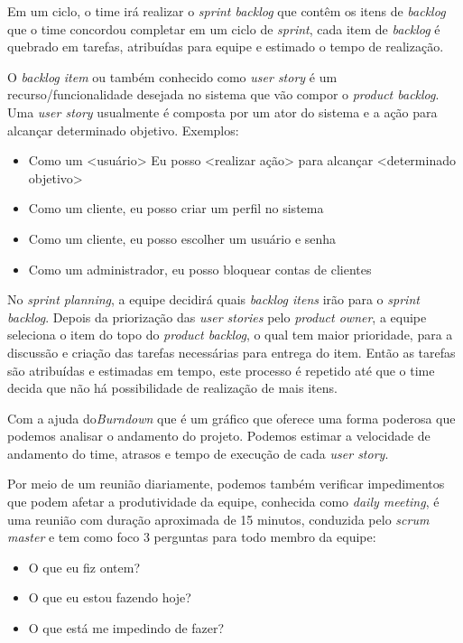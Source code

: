 \documentclass{abnt}
\begin{document}
			Em um ciclo, o time irá realizar o \emph{sprint backlog} que contêm os itens de \emph{backlog} que o time concordou 
			completar em um ciclo de \emph{sprint}, cada item de \emph{backlog} é quebrado em tarefas, atribuídas para equipe e estimado o tempo de realização.
			
					
			O \emph{backlog item} ou também conhecido como \emph{user story} é um recurso/funcionalidade desejada no sistema que vão compor o
			\emph{product backlog}. Uma \emph{user story} usualmente é composta por um ator do sistema e a ação para alcançar determinado
			objetivo. Exemplos: 
				\begin{itemize}
					\item Como um <usuário> Eu posso <realizar ação> para alcançar <determinado objetivo>
					\item Como um cliente, eu posso criar um perfil no sistema
					\item Como um cliente, eu posso escolher um usuário e senha
					\item Como um administrador, eu posso bloquear contas de clientes
				\end{itemize}
					 
					
			No \emph{sprint planning}, a equipe decidirá quais \emph{backlog itens} irão para o \emph{sprint backlog}. Depois da priorização das \emph{user
			stories} pelo \emph{product owner}, a equipe seleciona o item do topo do \emph{product backlog}, o qual tem maior prioridade, para a
			discussão e criação das tarefas necessárias para entrega do item. Então as tarefas são atribuídas e estimadas em
			tempo, este processo é repetido até que o time decida que não há possibilidade de realização de mais itens.
			
			Com a ajuda do\emph{Burndown} que é um gráfico que oferece uma forma poderosa que podemos analisar o andamento do projeto. Podemos estimar a velocidade de andamento do time, atrasos e tempo de 
			execução de cada \emph{user story}.
			
			Por meio de um reunião diariamente, podemos também verificar impedimentos que podem afetar a produtividade da equipe, conhecida como \emph{daily meeting}, 
			é uma reunião com duração aproximada de 15 minutos,	conduzida pelo \emph{scrum master} e tem como foco 3 perguntas para todo membro da equipe:
				\begin{itemize}
					\item O que eu fiz ontem?
					\item O que eu estou fazendo hoje?
					\item O que está me impedindo de fazer?
				\end{itemize}
			
\end{document}

